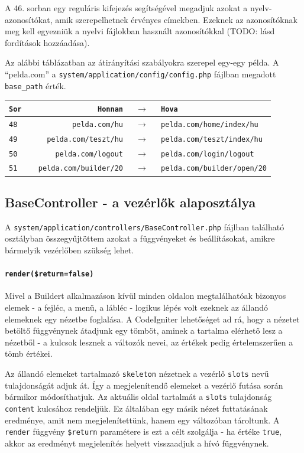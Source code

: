 \documentclass[12pt,a4paper,twoside]{article}
\begin{document}
A 46. sorban egy reguláris kifejezés segítségével megadjuk azokat a
nyelv-azonosítókat, amik szerepelhetnek érvényes címekben. Ezeknek az
azonosítóknak meg kell egyezniük a nyelvi fájlokban használt azonosítókkal
(TODO: lásd fordítások hozzáadása).

Az alábbi táblázatban az átirányítási szabályokra szerepel egy-egy példa. A
``pelda.com'' a \texttt{system/application/config/config.php} fájlban megadott
\texttt{base\_path} érték.

\begin{tabular*}{\textwidth}{>{\tt}l|>{\tt}r>{$\rightarrow$}c>{\tt}l}
  \rm Sor & \rm Honnan           & & \rm Hova        \\
  \hline
  48      & pelda.com/hu         & & pelda.com/home/index/hu  \\
  49      & pelda.com/teszt/hu   & & pelda.com/teszt/index/hu \\
  50      & pelda.com/logout     & & pelda.com/login/logout   \\
  51      & pelda.com/builder/20 & & pelda.com/builder/open/20
\end{tabular*}


\subsection{BaseController - a vezérlők alaposztálya}

A \texttt{system/application/controllers/BaseController.php} fájlban található
osztályban összegyűjtöttem azokat a függvényeket és beállításokat, amikre
bármelyik vezérlőben szükség lehet.

\paragraph{\texttt{render(\$return=false)}}
Mivel a Buildert alkalmazáson kívül minden oldalon megtalálhatóak bizonyos
elemek - a fejléc, a menü, a lábléc - logikus lépés volt ezeknek az állandó
elemeknek egy nézetbe foglalása. A CodeIgniter lehetőséget ad rá, hogy a
nézetet betöltő függvénynek átadjunk egy tömböt, aminek a tartalma elérhető lesz
a nézetből - a kulcsok lesznek a változók nevei, az értékek pedig értelemszerűen
a tömb értékei.

Az állandó elemeket tartalmazó \texttt{skeleton} nézetnek a vezérlő
\texttt{slots} nevű tulajdonságát adjuk át. Így a megjelenítendő elemeket a
vezérlő futása során bármikor módosíthatjuk. Az aktuális oldal tartalmát a
\texttt{slots} tulajdonság \texttt{content} kulcsához rendeljük. Ez általában
egy másik nézet futtatásának eredménye, amit nem megjelenítettünk, hanem egy
változóban tároltunk. A \texttt{render} függvény \texttt{\$return} paramétere is
ezt a célt szolgálja - ha értéke \texttt{true}, akkor az eredményt megjelenítés
helyett visszaadjuk a hívó függvénynek.
\end{document}

